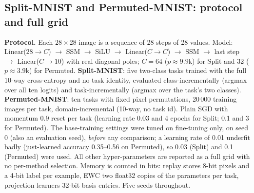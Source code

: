 \subsection{Split-MNIST and Permuted-MNIST: protocol and full grid}\label{app:mnist}
\textbf{Protocol.} Each $28\times28$ image is a sequence of 28 steps of 28 values. Model: Linear(28$\to C$) $\to$ SSM $\to$ SiLU $\to$ Linear($C\to C$) $\to$ SSM $\to$ last step $\to$ Linear($C\to10$) with real diagonal poles; $C=64$ ($p\approx9.9$k) for Split and 32 ($p\approx3.9$k) for Permuted. \textbf{Split-MNIST}: five two-class tasks trained with the full 10-way cross-entropy and no task identity, evaluated class-incrementally (argmax over all ten logits) and task-incrementally (argmax over the task's two classes). \textbf{Permuted-MNIST}: ten tasks with fixed pixel permutations, 20\,000 training images per task, domain-incremental (10-way, no task id). Plain SGD with momentum 0.9 reset per task (learning rate 0.03 and 4 epochs for Split; 0.1 and 3 for Permuted). The base-training settings were tuned on fine-tuning only, on seed 0 (also an evaluation seed), \emph{before} any comparison; a learning rate of 0.01 underfit badly (just-learned accuracy 0.35--0.56 on Permuted), so 0.03 (Split) and 0.1 (Permuted) were used. All other hyper-parameters are reported as a full grid with no per-method selection. Memory is counted in bits: replay stores 8-bit pixels and a 4-bit label per example, EWC two float32 copies of the parameters per task, projection learners 32-bit basis entries. Five seeds throughout.

\begin{table}[!htbp]
  \caption{Split-MNIST, \emph{class-incremental}: final average accuracy, forgetting, last-task accuracy, bits (mean $\pm$ s.d.\ over 5 seeds; settings separated by slashes).}\label{tab:mnistci}
  \centering\scriptsize\setlength{\tabcolsep}{4pt}
  \resizebox{\linewidth}{!}{}
\end{table}
\begin{table}[!htbp]
  \caption{Split-MNIST, \emph{task-incremental} (task id given at test time).}\label{tab:mnistti}
  \centering\scriptsize\setlength{\tabcolsep}{4pt}
  \resizebox{\linewidth}{!}{}
\end{table}
\begin{table}[!htbp]
  \caption{Permuted-MNIST, domain-incremental (no task id).}\label{tab:mnistperm}
  \centering\scriptsize\setlength{\tabcolsep}{4pt}
  \resizebox{\linewidth}{!}{}
\end{table}

